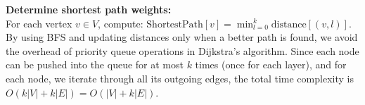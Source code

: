 \begin{parts}
\begin{solution}
\begin{itemize}
\begin{itemize}
\begin{itemize}
            \end{itemize} 
        \end{itemize} 
    \end{itemize}
    \textbf{Determine shortest path weights:}\\
    For each vertex $v \in V$, compute: $ \text{ShortestPath}[v] = \min_{l = 0}^{k} \text{distance}[(v, l)]. $
    \vspace{1cm} \\  
        By using BFS and updating distances only when a better path is found, we avoid the overhead of priority queue operations in Dijkstra's algorithm. Since each node can be pushed into the queue for at most $k$ times (once for each layer), and for each node, we iterate through all its outgoing edges, the total time complexity is $O(k|V| + k|E|) = O(|V| + k|E|)$.
        

\end{solution}
\end{parts}